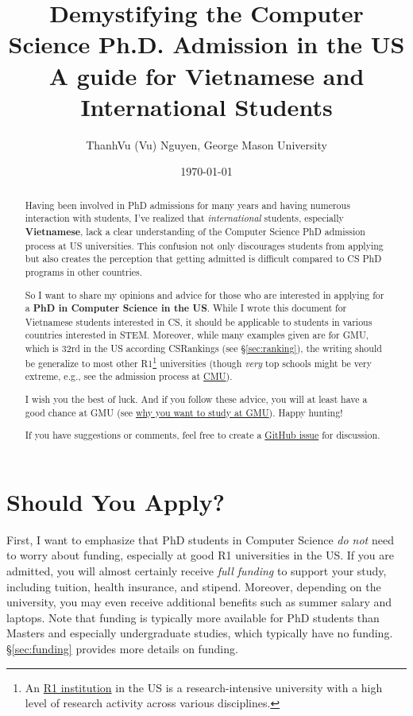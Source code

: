 \documentclass[11pt]{article}
\title{Demystifying the Computer Science Ph.D. Admission in the US \\{\Large A guide for Vietnamese and International Students}}
\date{\today}
\author{\small ThanhVu (Vu) Nguyen, George Mason University}
\begin{document}
\maketitle

\begin{abstract}
Having been involved in PhD admissions for many years and having
numerous interaction with  students, I've
realized that \emph{international} students, especially \textbf{Vietnamese}, lack a clear understanding of
the Computer Science PhD admission process at US universities. This confusion not only
discourages students from applying but also creates the perception that
getting admitted is difficult compared to CS PhD programs in other countries.

So I want to share my opinions and advice for those who are interested in applying for a \textbf{PhD in Computer Science in the US}.
While I wrote this document for Vietnamese students interested in CS, it should be applicable to students in various countries interested in STEM.
Moreover, while many examples given are for GMU, which is 32rd in the US according CSRankings (see \S\ref{sec:ranking}), the writing should be generalize to most other R1\footnote{An \href{https://en.wikipedia.org/wiki/List_of_research_universities_in_the_United_States}{R1 institution} in the US is a research-intensive university with a high level of research activity across various disciplines.} universities  (though \emph{very} top schools might be very extreme, e.g., see the admission process at \href{https://da-data.blogspot.com/2015/03/reflecting-on-cs-graduate-admissions.html}{CMU}).

I wish you the best of luck. And if you follow these advice,
you will at least have a good chance at GMU (see
\href{https://github.com/dynaroars/dynaroars.github.io/wiki/About-GMU}{why
you want to study at GMU}). Happy hunting!

If you have suggestions or comments, feel free to create a \href{https://github.com/nguyenthanhvuh/phd-cs-us/issues}{GitHub issue} for discussion.
\end{abstract}

\section{Should You Apply?}

First, I want to emphasize that PhD students in Computer
Science \emph{do not} need to worry about funding, especially at good R1
universities in the US. If you are admitted, you will almost certainly
receive \emph{full funding} to support your study, including tuition,
health insurance, and stipend. Moreover, depending on the university,
you may even receive additional benefits such as summer salary and laptops. Note that
funding is typically more available for PhD students than 
Masters and especially undergraduate studies, which typically have no funding. \S\ref{sec:funding} provides more details on funding.
\end{document}

